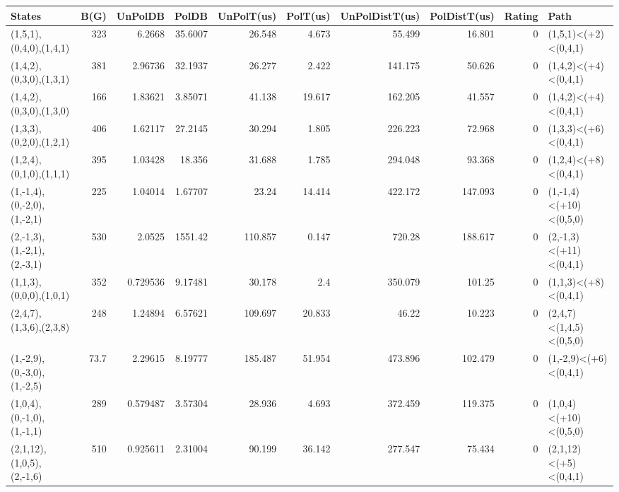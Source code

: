 \begin{tabular}{lrrrrrrrrl}
\hline
 States                      &   B(G) &   UnPolDB &       PolDB &   UnPolT(us) &   PolT(us) &   UnPolDistT(us) &   PolDistT(us) &   Rating & Path                    \\
\hline
 (1,5,1),(0,4,0),(1,4,1)     &  323   &  6.2668   &   35.6007   &       26.548 &      4.673 &           55.499 &         16.801 &        0 & (1,5,1)<(+2)<(0,4,1)    \\
 (1,4,2),(0,3,0),(1,3,1)     &  381   &  2.96736  &   32.1937   &       26.277 &      2.422 &          141.175 &         50.626 &        0 & (1,4,2)<(+4)<(0,4,1)    \\
 (1,4,2),(0,3,0),(1,3,0)     &  166   &  1.83621  &    3.85071  &       41.138 &     19.617 &          162.205 &         41.557 &        0 & (1,4,2)<(+4)<(0,4,1)    \\
 (1,3,3),(0,2,0),(1,2,1)     &  406   &  1.62117  &   27.2145   &       30.294 &      1.805 &          226.223 &         72.968 &        0 & (1,3,3)<(+6)<(0,4,1)    \\
 (1,2,4),(0,1,0),(1,1,1)     &  395   &  1.03428  &   18.356    &       31.688 &      1.785 &          294.048 &         93.368 &        0 & (1,2,4)<(+8)<(0,4,1)    \\
 (1,-1,4),(0,-2,0),(1,-2,1)  &  225   &  1.04014  &    1.67707  &       23.24  &     14.414 &          422.172 &        147.093 &        0 & (1,-1,4)<(+10)<(0,5,0)  \\
 (2,-1,3),(1,-2,1),(2,-3,1)  &  530   &  2.0525   & 1551.42     &      110.857 &      0.147 &          720.28  &        188.617 &        0 & (2,-1,3)<(+11)<(0,4,1)  \\
 (1,1,3),(0,0,0),(1,0,1)     &  352   &  0.729536 &    9.17481  &       30.178 &      2.4   &          350.079 &        101.25  &        0 & (1,1,3)<(+8)<(0,4,1)    \\
 (2,4,7),(1,3,6),(2,3,8)     &  248   &  1.24894  &    6.57621  &      109.697 &     20.833 &           46.22  &         10.223 &        0 & (2,4,7)<(1,4,5)<(0,5,0) \\
 (1,-2,9),(0,-3,0),(1,-2,5)  &   73.7 &  2.29615  &    8.19777  &      185.487 &     51.954 &          473.896 &        102.479 &        0 & (1,-2,9)<(+6)<(0,4,1)   \\
 (1,0,4),(0,-1,0),(1,-1,1)   &  289   &  0.579487 &    3.57304  &       28.936 &      4.693 &          372.459 &        119.375 &        0 & (1,0,4)<(+10)<(0,5,0)   \\
 (2,1,12),(1,0,5),(2,-1,6)   &  510   &  0.925611 &    2.31004  &       90.199 &     36.142 &          277.547 &         75.434 &        0 & (2,1,12)<(+5)<(0,4,1)   \\

\end{tabular}
